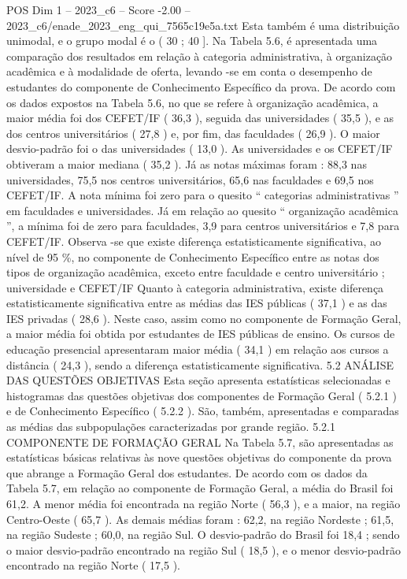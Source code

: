 \begin{textsample}{POS Dim 1 – 2023\_c6 – Score -2.00 – 2023\_c6/enade\_2023\_eng\_qui\_7565c19e5a.txt}
Esta também é uma distribuição unimodal, e o grupo modal é o ( 30 ; 40 ].
Na Tabela 5.6, é apresentada uma comparação dos resultados em relação à categoria administrativa, à organização acadêmica e à modalidade de oferta, levando -se em conta o desempenho de estudantes do componente de Conhecimento Específico da prova.
De acordo com os dados expostos na Tabela 5.6, no que se refere à organização acadêmica, a maior média foi dos CEFET/IF ( 36,3 ), seguida das universidades ( 35,5 ), e as dos centros universitários ( 27,8 ) e, por fim, das faculdades ( 26,9 ).
O maior desvio-padrão foi o das universidades ( 13,0 ).
As universidades e os CEFET/IF obtiveram a maior mediana ( 35,2 ).
Já as notas máximas foram : 88,3 nas universidades, 75,5 nos centros universitários, 65,6 nas faculdades e 69,5 nos CEFET/IF.
A nota mínima foi zero para o quesito “ categorias administrativas ” em faculdades e universidades.
Já em relação ao quesito “ organização acadêmica ”, a mínima foi de zero para faculdades, 3,9 para centros universitários e 7,8 para CEFET/IF.
Observa -se que existe diferença estatisticamente significativa, ao nível de 95 \%, no componente de Conhecimento Específico entre as notas dos tipos de organização acadêmica, exceto entre faculdade e centro universitário ; universidade e CEFET/IF Quanto à categoria administrativa, existe diferença estatisticamente significativa entre as médias das IES públicas ( 37,1 ) e as das IES privadas ( 28,6 ).
Neste caso, assim como no componente de Formação Geral, a maior média foi obtida por estudantes de IES públicas de ensino.
Os cursos de educação presencial apresentaram maior média ( 34,1 ) em relação aos cursos a distância ( 24,3 ), sendo a diferença estatisticamente significativa. 5.2 ANÁLISE DAS QUESTÕES OBJETIVAS Esta seção apresenta estatísticas selecionadas e histogramas das questões objetivas dos componentes de Formação Geral ( 5.2.1 ) e de Conhecimento Específico ( 5.2.2 ).
São, também, apresentadas e comparadas as médias das subpopulações caracterizadas por grande região. 5.2.1 COMPONENTE DE FORMAÇÃO GERAL Na Tabela 5.7, são apresentadas as estatísticas básicas relativas às nove questões objetivas do componente da prova que abrange a Formação Geral dos estudantes.
De acordo com os dados da Tabela 5.7, em relação ao componente de Formação Geral, a média do Brasil foi 61,2.
A menor média foi encontrada na região Norte ( 56,3 ), e a maior, na região Centro-Oeste ( 65,7 ).
As demais médias foram : 62,2, na região Nordeste ; 61,5, na região Sudeste ; 60,0, na região Sul.
O desvio-padrão do Brasil foi 18,4 ; sendo o maior desvio-padrão encontrado na região Sul ( 18,5 ), e o menor desvio-padrão encontrado na região Norte ( 17,5 ).

\end{textsample}
